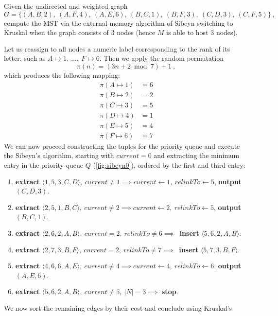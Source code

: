 \exercise

Given the undirected and weighted graph  $$G = \big\{ (A,B,2),\ (A,F,4),\ (A,E,6),\
(B,C,1),\ (B,F,3),\ (C,D,3),\ (C,F,5) \big\}\ ,$$ compute the MST via the
external-memory algorithm of Sibeyn switching to Kruskal when the graph consists
of 3 nodes (hence $M$ is able to host 3 nodes).

\solution

Let us reassign to all nodes a numeric label corresponding to the rank of its
letter, such as $A \mapsto 1,\ \dots,\ F \mapsto 6$. Then we apply the random
permutation $$\pi(n) = \left( 3n + 2 \bmod 7 \right) + 1\ ,$$ which produces the
following mapping:
%
\begin{align*}
  \pi(A \mapsto 1) &= 6 \\
  \pi(B \mapsto 2) &= 2 \\
  \pi(C \mapsto 3) &= 5 \\
  \pi(D \mapsto 4) &= 1 \\
  \pi(E \mapsto 5) &= 4 \\
  \pi(F \mapsto 6) &= 7
\end{align*}
%
We can now proceed constructing the tuples for the priority queue and execute
the Sibeyn's algorithm, starting with $current = 0$ and extracting the minimum
entry in the priority queue $Q$ (\autoref{fig:sibeyn0}), ordered by the first
and third entry:
%
\begin{enumerate}
  \item {\bf extract} $\langle 1,5,3,C,D \rangle,\ current \neq 1 \implies current \gets 1,\ relinkTo \gets 5$, {\bf output} $(C,D,3)$.
  \item {\bf extract} $\langle 2,5,1,B,C \rangle,\ current \neq 2 \implies current \gets 2,\ relinkTo \gets 5$, {\bf output} $(B,C,1)$.
  \item {\bf extract} $\langle 2,6,2,A,B \rangle,\ current = 2,\ relinkTo \neq 6 \implies\ $ {\bf insert}  $\langle 5,6,2,A,B \rangle$.
  \item {\bf extract} $\langle 2,7,3,B,F \rangle,\ current = 2,\ relinkTo \neq 7 \implies\ $ {\bf insert}  $\langle 5,7,3,B,F \rangle$.
  \item {\bf extract} $\langle 4,6,6,A,E \rangle,\ current \neq 4 \implies current \gets 4,\ relinkTo \gets 6$, {\bf output} $(A,E,6)$.
  \item {\bf extract} $\langle 5,6,2,A,B \rangle,\ current \neq 5,\ |N| = 3 \implies $ {\bf stop}.
\end{enumerate}
%
We now sort the remaining edges by their cost and conclude using Kruskal's
